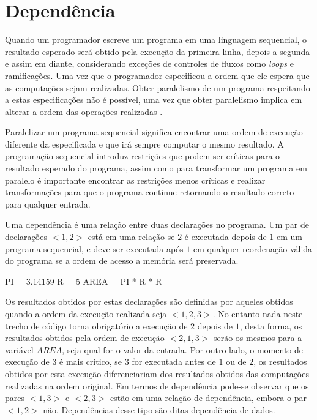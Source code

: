 
\section{Dependência}

Quando um programador escreve um programa em uma linguagem sequencial, o
resultado esperado será obtido pela execução da primeira linha, depois a segunda
e assim em diante, considerando exceções de controles de fluxos como
\textit{loops} e ramificações. 
Uma vez que o programador especificou a ordem que ele espera que as computações 
sejam realizadas. 
Obter paralelismo de um programa respeitando a estas especificações não é
possível, uma vez que obter paralelismo implica em alterar a ordem das
operações realizadas \cite[1.8]{ocfma}.

Paralelizar um programa sequencial significa encontrar uma ordem de execução
diferente da especificada e que irá sempre computar o mesmo resultado.
A programação sequencial introduz restrições que podem ser críticas para o
resultado esperado do programa, assim como para transformar um programa em paralelo é
importante encontrar as restrições menos críticas e realizar transformações para
que o programa continue retornando o resultado correto para qualquer entrada.



Uma dependência é uma relação entre duas declarações no programa. 
Um par de declarações $<1,2>$ está em uma relação se $2$ é executada 
depois de $1$ em um programa sequencial, e deve ser executada após $1$ 
em qualquer reordenação válida do programa se a ordem de acesso a 
memória será preservada.

\begin{algorithm}
        \begin{algorithmic}[1]
                \STATE PI = 3.14159
                \STATE R = 5
                \STATE AREA = PI * R * R
\end{algorithmic}
\end{algorithm}


Os resultados obtidos por estas declarações são definidas por aqueles obtidos
quando a ordem da execução realizada seja $<1,2,3>$. 
No entanto nada neste trecho de código torna obrigatório a execução de 
$2$ depois de $1$, desta forma, os resultados obtidos pela ordem de execução 
$<2,1,3>$ serão os mesmos para a variável $AREA$, seja qual for o valor 
da entrada.
Por outro lado, o momento de execução de $3$ é mais crítico, se $3$ for
executada antes de $1$ ou de $2$, os resultados obtidos por esta execução
diferenciariam dos resultados obtidos das computações realizadas na ordem
original.
Em termos de dependência pode-se observar que os pares $<1,3>$ e $<2,3>$
estão em uma relação de dependência, embora o par $<1,2>$ não.
Dependências desse tipo são ditas dependência de dados.

